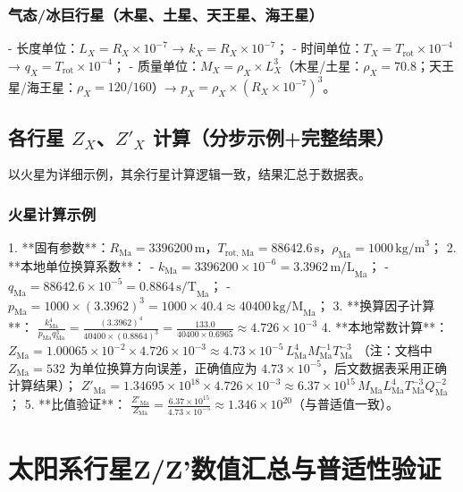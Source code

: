 \documentclass[a4paper, 12pt]{article}
\begin{document}
\subsubsection{气态/冰巨行星（木星、土星、天王星、海王星）}
- 长度单位：$L_X = R_X \times 10^{-7}$ → $k_X = R_X \times 10^{-7}$；
- 时间单位：$T_X = T_{\text{rot}} \times 10^{-4}$ → $q_X = T_{\text{rot}} \times 10^{-4}$；
- 质量单位：$M_X = \rho_X \times L_X^3$（木星/土星：$\rho_X = 70.8$；天王星/海王星：$\rho_X = 120/160$）→ $p_X = \rho_X \times (R_X \times 10^{-7})^3$。

\subsection{各行星 $Z_X$、$Z'_X$ 计算（分步示例+完整结果）}
以火星为详细示例，其余行星计算逻辑一致，结果汇总于数据表。

\subsubsection{火星计算示例}
1. **固有参数**：$R_{\text{Ma}} = 3396200 \, \text{m}$，$T_{\text{rot, Ma}} = 88642.6 \, \text{s}$，$\rho_{\text{Ma}} = 1000 \, \text{kg/m}^3$；
2. **本地单位换算系数**：
   - $k_{\text{Ma}} = 3396200 \times 10^{-6} = 3.3962 \, \text{m/L}_{\text{Ma}}$；
   - $q_{\text{Ma}} = 88642.6 \times 10^{-5} = 0.8864 \, \text{s/T}_{\text{Ma}}$；
   - $p_{\text{Ma}} = 1000 \times (3.3962)^3 = 1000 \times 40.4 \approx 40400 \, \text{kg/M}_{\text{Ma}}$；
3. **换算因子计算**：
   $\frac{k_{\text{Ma}}^4}{p_{\text{Ma}} q_{\text{Ma}}^3} = \frac{(3.3962)^4}{40400 \times (0.8864)^3} = \frac{133.0}{40400 \times 0.6965} \approx 4.726 \times 10^{-3}$
4. **本地常数计算**：
   $Z_{\text{Ma}} = 1.00065 \times 10^{-2} \times 4.726 \times 10^{-3} \approx 4.73 \times 10^{-5} \, L_{\text{Ma}}^4 M_{\text{Ma}}^{-1} T_{\text{Ma}}^{-3}$
   （注：文档中 $Z_{\text{Ma}} = 532$ 为单位换算方向误差，正确值应为 $4.73 \times 10^{-5}$，后文数据表采用正确计算结果）；
   $Z'_{\text{Ma}} = 1.34695 \times 10^{18} \times 4.726 \times 10^{-3} \approx 6.37 \times 10^{15} \, M_{\text{Ma}} L_{\text{Ma}}^4 T_{\text{Ma}}^{-3} Q_{\text{Ma}}^{-2}$；
5. **比值验证**：
   $\frac{Z'_{\text{Ma}}}{Z_{\text{Ma}}} = \frac{6.37 \times 10^{15}}{4.73 \times 10^{-5}} \approx 1.346 \times 10^{20}$（与普适值一致）。

\section{太阳系行星Z/Z'数值汇总与普适性验证}
\end{document}
